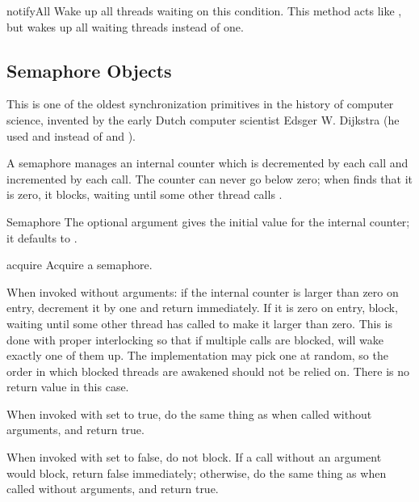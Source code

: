 \begin{methoddesc}{notifyAll}{}
Wake up all threads waiting on this condition.  This method acts like
, but wakes up all waiting threads instead of one.
\end{methoddesc}


\subsection{Semaphore Objects \label{semaphore-objects}}

This is one of the oldest synchronization primitives in the history of
computer science, invented by the early Dutch computer scientist
Edsger W. Dijkstra (he used  and  instead of
 and ).

A semaphore manages an internal counter which is decremented by each
 call and incremented by each 
call.  The counter can never go below zero; when 
finds that it is zero, it blocks, waiting until some other thread
calls .

\begin{classdesc}{Semaphore}{}
The optional argument gives the initial value for the internal
counter; it defaults to .
\end{classdesc}

\begin{methoddesc}{acquire}{}
Acquire a semaphore.

When invoked without arguments: if the internal counter is larger than
zero on entry, decrement it by one and return immediately.  If it is
zero on entry, block, waiting until some other thread has called
 to make it larger than zero.  This is done with
proper interlocking so that if multiple  calls are
blocked,  will wake exactly one of them up.  The
implementation may pick one at random, so the order in which blocked
threads are awakened should not be relied on.  There is no return
value in this case.

When invoked with  set to true, do the same thing as
when called without arguments, and return true.

When invoked with  set to false, do not block.  If a
call without an argument would block, return false immediately;
otherwise, do the same thing as when called without arguments, and
return true.
\end{methoddesc}

